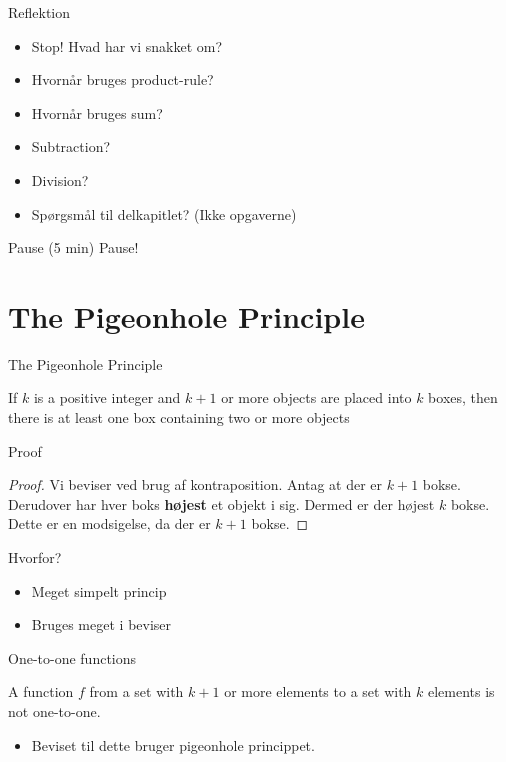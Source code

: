 \documentclass{beamer}
\begin{document}
\begin{frame}{Reflektion}
    \begin{itemize}
        \item Stop! Hvad har vi snakket om? 
        \item Hvornår bruges product-rule? 
        \item Hvornår bruges sum? 
        \item Subtraction? 
        \item Division? 
        \item Spørgsmål til delkapitlet? (Ikke opgaverne)
    \end{itemize}
\end{frame}


\begin{frame}{Pause (5 min)}
    Pause!
\end{frame}

\section{The Pigeonhole Principle}

\begin{frame}{The Pigeonhole Principle}
\begin{theorem}
    If $k$ is a positive integer and $k+1$ or more objects are placed into $k$ boxes, then there is at least one box containing two or more objects
\end{theorem}
\end{frame}

\begin{frame}{Proof}
\begin{proof}
    Vi beviser ved brug af kontraposition. Antag at der er $k+1$ bokse. Derudover har hver boks \textbf{højest} et objekt i sig. Dermed er der højest $k$ bokse. Dette er en modsigelse, da der er $k+1$ bokse.
\end{proof}
\end{frame}

\begin{frame}{Hvorfor?}
   \begin{itemize}
       \item Meget simpelt princip
       \item Bruges meget i beviser
   \end{itemize} 
\end{frame}

\begin{frame}{One-to-one functions}
\begin{corollary}
    A function $f$ from a set with $k+1$ or more elements to a set with $k$ elements is not one-to-one.
\end{corollary}
    \begin{itemize}
        \item Beviset til dette bruger pigeonhole princippet.
    \end{itemize}
\end{frame}
\end{document}
